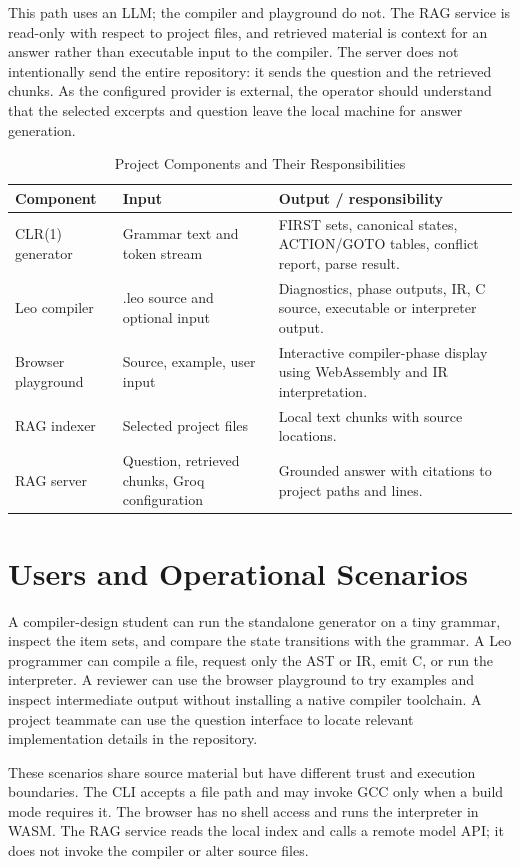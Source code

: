 \documentclass[12pt,a4paper,oneside]{report}
\begin{document}
This path uses an LLM; the compiler and playground do not. The RAG service is read-only with respect to project files, and retrieved material is context for an answer rather than executable input to the compiler. The server does not intentionally send the entire repository: it sends the question and the retrieved chunks. As the configured provider is external, the operator should understand that the selected excerpts and question leave the local machine for answer generation.

\begin{table}[H]
\centering
\caption{Project Components and Their Responsibilities}
\begin{tabularx}{\textwidth}{p{2.8cm}p{3.4cm}Y}
\toprule
\textbf{Component} & \textbf{Input} & \textbf{Output / responsibility}\\
\midrule
CLR(1) generator & Grammar text and token stream & FIRST sets, canonical states, ACTION/GOTO tables, conflict report, parse result.\\
Leo compiler & .leo source and optional input & Diagnostics, phase outputs, IR, C source, executable or interpreter output.\\
Browser playground & Source, example, user input & Interactive compiler-phase display using WebAssembly and IR interpretation.\\
RAG indexer & Selected project files & Local text chunks with source locations.\\
RAG server & Question, retrieved chunks, Groq configuration & Grounded answer with citations to project paths and lines.\\
\bottomrule
\end{tabularx}
\end{table}

\section{Users and Operational Scenarios}
A compiler-design student can run the standalone generator on a tiny grammar, inspect the item sets, and compare the state transitions with the grammar. A Leo programmer can compile a file, request only the AST or IR, emit C, or run the interpreter. A reviewer can use the browser playground to try examples and inspect intermediate output without installing a native compiler toolchain. A project teammate can use the question interface to locate relevant implementation details in the repository.

These scenarios share source material but have different trust and execution boundaries. The CLI accepts a file path and may invoke GCC only when a build mode requires it. The browser has no shell access and runs the interpreter in WASM. The RAG service reads the local index and calls a remote model API; it does not invoke the compiler or alter source files.
\end{document}
